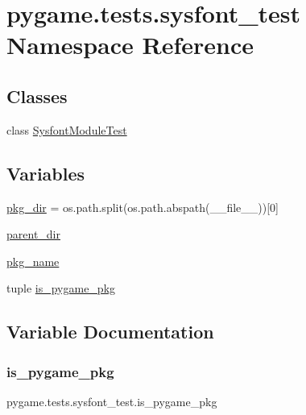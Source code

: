 \hypertarget{namespacepygame_1_1tests_1_1sysfont__test}{}\section{pygame.\+tests.\+sysfont\+\_\+test Namespace Reference}
\label{namespacepygame_1_1tests_1_1sysfont__test}
\subsection*{Classes}
\begin{DoxyCompactItemize}
\item 
class \hyperlink{classpygame_1_1tests_1_1sysfont__test_1_1_sysfont_module_test}{Sysfont\+Module\+Test}
\end{DoxyCompactItemize}
\subsection*{Variables}
\begin{DoxyCompactItemize}
\item 
\hyperlink{namespacepygame_1_1tests_1_1sysfont__test_ae0393d940d2479ac4afd884c9813215d}{pkg\+\_\+dir} = os.\+path.\+split(os.\+path.\+abspath(\+\_\+\+\_\+file\+\_\+\+\_\+))\mbox{[}0\mbox{]}
\item 
\hyperlink{namespacepygame_1_1tests_1_1sysfont__test_a3cf1dde311501c4ab0cf5e752d49e12a}{parent\+\_\+dir}
\item 
\hyperlink{namespacepygame_1_1tests_1_1sysfont__test_a1baa9a5561494047f664d7f347b3d2c5}{pkg\+\_\+name}
\item 
tuple \hyperlink{namespacepygame_1_1tests_1_1sysfont__test_af3f3a186e07be2bc3e4722f9ea51f6ae}{is\+\_\+pygame\+\_\+pkg}
\end{DoxyCompactItemize}


\subsection{Variable Documentation}
\mbox{\label{namespacepygame_1_1tests_1_1sysfont__test_af3f3a186e07be2bc3e4722f9ea51f6ae}} 
\subsubsection{\texorpdfstring{is\+\_\+pygame\+\_\+pkg}{is\_pygame\_pkg}}
{\footnotesize\ttfamily pygame.\+tests.\+sysfont\+\_\+test.\+is\+\_\+pygame\+\_\+pkg}

